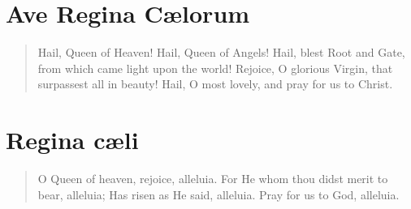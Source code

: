 {{\afterant{}
}


\section{Ave Regina Cælorum}
\printsimpletone{}
\printsolemntone{}
\begin{quote}{Hail, Queen of Heaven! Hail, Queen of Angels! Hail, blest Root and Gate, from which came light upon the world! Rejoice, O glorious Virgin, that surpassest all in beauty! Hail, O most lovely, and pray for us to Christ.}\end{quote}

%
\pagebreak

{
\newcommand{\vlatin}{Dignáre me laudáre te Vírgo sacráta.}
\newcommand{\venglish}{Voucshafe, O holy Virgin, that I may praise thee.}
\newcommand{\rlatin}{Da míhi virtútem cóntra hóstes túos.}
\newcommand{\renglish}{Give me power against thine enemies.}
\newcommand{\prayerlatin}{Concéde, miséricors Deus, fragilitáti nostræ præ\-sí\-di\-um :~\gredagger{}~ut qui sanctæ Dei Genitrícis memóriam ágimus, * intercessiónis ejus auxílio a nostris iniquitátibus resurgámus. Per eúmdem Christum Dóminum nostrum. \Rbar~Amen.}
\newcommand{\prayerenglish}{Grant, O merciful God, Thy protection to us in our weakness; that we, who celebrate the memory of the holy Mother of God, may, through the aid of her intercession, rise again from our sins. Through the same Christ our Lord. \Rbar~Amen.}

\afterant{}
}



\section{Regina cæli}
\printsimpletone{}
\printsolemntone{}

\begin{quote}{O Queen of heaven, rejoice, alleluia.
For He whom thou didst merit to bear, alleluia;
Has risen as He said, alleluia.
Pray for us to God, alleluia.}\end{quote}

}
